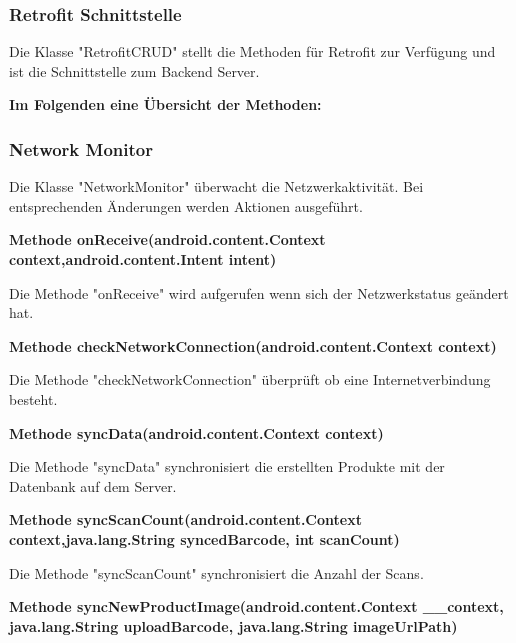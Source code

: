 \documentclass{scrartcl}
\begin{document}
\newpage

\subsubsection{Retrofit Schnittstelle}

Die Klasse "RetrofitCRUD" stellt die Methoden für Retrofit zur Verfügung und ist die Schnittstelle zum Backend Server. \newline 

\noindent\textbf{Im Folgenden eine Übersicht der Methoden:}

\noindent


\subsubsection{Network Monitor}
Die Klasse "NetworkMonitor" überwacht die Netzwerkaktivität. Bei entsprechenden Änderungen werden Aktionen ausgeführt. \newline

\noindent\textbf{Methode onReceive(android.content.Context context,\newline               android.content.Intent intent)}

\noindent Die Methode "onReceive" wird aufgerufen wenn sich der Netzwerkstatus geändert hat. \newline 

\noindent\textbf{Methode checkNetworkConnection(android.content.Context context)}

\noindent Die Methode "checkNetworkConnection" überprüft ob eine Internetverbindung besteht. \newline 

\noindent\textbf{Methode syncData(android.content.Context context)}

\noindent Die Methode "syncData" synchronisiert die erstellten Produkte mit der Datenbank auf dem Server. \newline 

\noindent\textbf{Methode syncScanCount(android.content.Context context,\newline            java.lang.String syncedBarcode, int scanCount)}

\noindent Die Methode "syncScanCount" synchronisiert die Anzahl der Scans. \newline

\noindent\textbf{Methode syncNewProductImage(android.content.Context \_\_context, \newline   java.lang.String uploadBarcode, java.lang.String imageUrlPath)}
\end{document}
